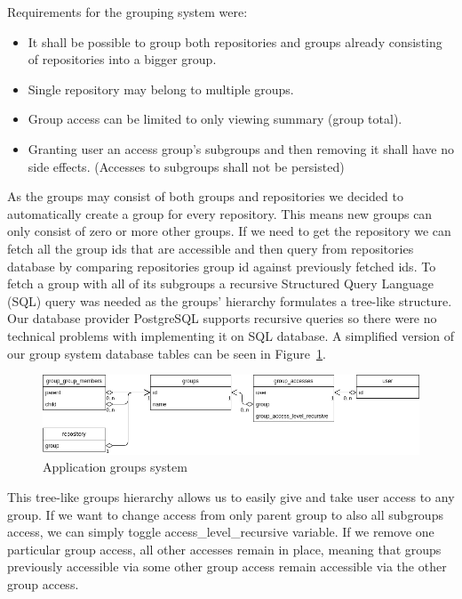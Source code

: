 Requirements for the grouping system were:
\begin{itemize}
    \item It shall be possible to group both repositories and groups already consisting of repositories into a bigger group.
    \item Single repository may belong to multiple groups.
    \item Group access can be limited to only viewing summary (group total).
    \item Granting user an access group's subgroups and then removing it shall have no side effects. (Accesses to subgroups shall not be persisted)
\end{itemize}

As the groups may consist of both groups and repositories we decided to automatically create a group for every repository.
This means new groups can only consist of zero or more other groups.
If we need to get the repository we can fetch all the group ids that are accessible and then query from repositories database by
comparing repositories group id against previously fetched ids.
To fetch a group with all of its subgroups a recursive Structured Query Language (SQL) query was needed as the groups'
hierarchy formulates a tree-like structure.
Our database provider PostgreSQL supports recursive queries so there were no technical problems with implementing it on SQL database.
A simplified version of our group system database tables can be seen in Figure~\ref{fig:group-system}.

\begin{figure}[h]
    \includegraphics[width=\textwidth]{figures/group_system}
    \caption{Application groups system}
    \label{fig:group-system}
\end{figure}

This tree-like groups hierarchy allows us to easily give and take user access to any group.
If we want to change access from only parent group to also all subgroups access, we can simply toggle access{\_}level{\_}recursive
variable.
If we remove one particular group access, all other accesses remain in place,
meaning that groups previously accessible via some other group access remain accessible via the other group access.

